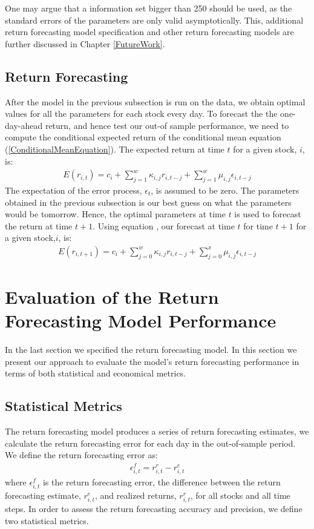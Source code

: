One may argue that a information set bigger than 250 should be used, as the standard errors of the parameters are only valid asymptotically. This, additional return forecasting model specification and other return forecasting models are further discussed in Chapter \ref{FutureWork}.


\subsection{Return Forecasting}

After the model in the previous subsection is run on the data, we obtain optimal values for all the parameters for each stock every day. To forecast the the one-day-ahead return, and hence test our out-of sample performance, we need to compute the conditional expected return of the conditional mean equation (\ref{ConditionalMeanEquation}). The expected return at time $t$ for a given stock, $i$, is:
\begin{align} 
    E(r_{i,t})=c_i+\sum_{j=1}^w\kappa_{i,j} r_{i,t-j}+\sum_{j=1}^w\mu_{i,j} \epsilon_{i,t-j} \label{ExpectedConditionalMean}
\end{align}
The expectation of the error process, $\epsilon_t$, is assumed to be zero. The parameters obtained in the previous subsection is our best guess on what the parameters would be tomorrow. Hence, the optimal parameters at time $t$ is used to forecast the return at time $t+1$. Using equation \label{ExpectedConditionalMean}, our forecast at time $t$ for time $t+1$ for a given stock,$i$, is:
\begin{align} 
    E(r_{i,t+1})=c_i+\sum_{j=0}^w\kappa_{i,j} r_{i,t-j}+\sum_{j=0}^x\mu_{i,j} \epsilon_{i,t-j}
\end{align}

\section{Evaluation of the Return Forecasting Model Performance}
In the last section we specified the return forecasting model. In this section we present our approach to evaluate the model's return forecasting performance in terms of both statistical and economical metrics. 

\subsection{Statistical Metrics}
The return forecasting model produces a series of return forecasting estimates, we calculate the return forecasting error for each day in the out-of-sample period. We define the return forecasting error as:
\begin{align}
    \epsilon_{i,t}^{f} = r_{i,t}^{r} - r_{i,t}^{e}
\end{align}
where $\epsilon_{i,t}^{f}$ is the return forecasting error, the difference between the return forecasting estimate, $r_{i,t}^{e}$, and realized returns, $r_{i,t}^{r}$, for all stocks and all time steps. In order to assess the return forecasting accuracy and precision, we define two statistical metrics. 

